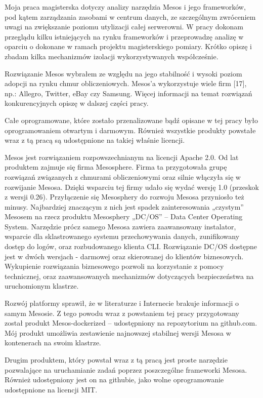 \documentclass[10pt,a4paper,titlepage,twoside]{report}
\begin{document}
Moja praca magisterska dotyczy analizy narzędzia Mesos i jego frameworków, pod kątem zarządzania zasobami w centrum danych, ze szczególnym zwróceniem uwagi na zwiększanie poziomu utylizacji całej serwerowni. W pracy dokonam przeglądu kilku istniejących na rynku frameworków i przeprowadzę analizę w oparciu o dokonane w ramach projektu magisterskiego pomiary. Krótko opiszę i zbadam kilka mechanizmów izolacji wykorzystywanych współcześnie.

Rozwiązanie Mesos wybrałem ze względu na jego stabilność i wysoki poziom adopcji na rynku chmur obliczeniowych. Mesos’a wykorzystuje wiele firm [17], np.: Allegro, Twitter, eBay czy Samsung. Więcej informacji na temat rozwiązań konkurencyjnych opiszę w dalszej części pracy.

Całe oprogramowane, które zostało przenalizowane bądź opisane w tej pracy było oprogramowaniem otwartym i darmowym. Również wszystkie produkty powstałe wraz z tą pracą są udostępnione na takiej właśnie licencji.

Mesos jest rozwiązaniem rozpowszechnianym na licencji Apache 2.0. Od lat produktem zajmuje się firma Mesosphere. Firma ta przygotowała grupę rozwiązań związanych z chmurami obliczeniowymi oraz silnie włączyła się w rozwijanie Mesosa. Dzięki wsparciu tej firmy udało się wydać wersję 1.0 (przeskok z wersji 0.26). Przyłączenie się Mesosphery do rozwoju Mesosa przyniosło też minusy. Najbardziej znaczącym z nich jest spadek zainteresowania „czystym” Mesosem na rzecz produktu Mesosphery „DC/OS” – Data Center Operating System. Narzędzie prócz samego Mesosa zawiera zaawansowany instalator, wsparcie dla sklastrowanego systemu przechowywania danych, zunifikowany dostęp do logów, oraz rozbudowanego klienta CLI. Rozwiązanie DC/OS dostępne jest w dwóch wersjach - darmowej oraz skierowanej do klientów biznesowych. Wykupienie rozwiązania biznesowego pozwoli na korzystanie z pomocy technicznej, oraz zaawansowanych mechanizmów dotyczących bezpieczeństwa na uruchomionym klastrze. 

Rozwój platformy sprawił, że w literaturze i Internecie brakuje informacji o samym Mesosie. Z tego powodu wraz z powstaniem tej pracy przygotowany został produkt Mesos-dockerized – udostępniony na repozytorium na github.com. Mój produkt umożliwia zestawienie najnowszej stabilnej wersji Mesosa w kontenerach na swoim klastrze. 

Drugim produktem, który powstał wraz z tą pracą jest proste narzędzie pozwalające na uruchamianie zadań poprzez poszczególne frameworki Mesosa. Również udostępniony jest on na githubie, jako wolne oprogramowanie udostępnione na licencji MIT.
\end{document}
